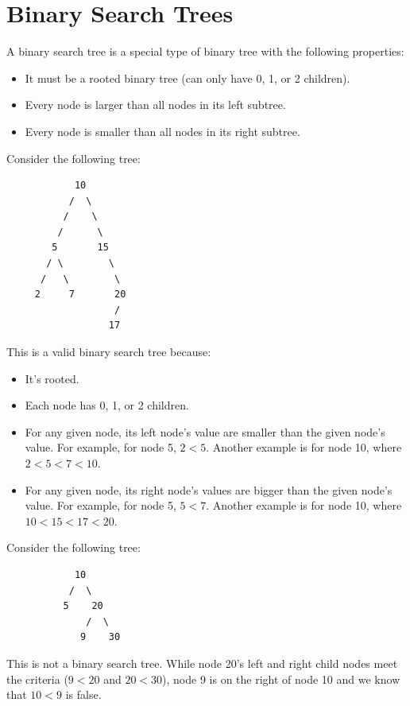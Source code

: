 \documentclass[letterpaper]{article}
\begin{document}
\section{Binary Search Trees}
A binary search tree is a special type of binary tree with the following properties: 
\begin{itemize}
    \item It must be a rooted binary tree (can only have 0, 1, or 2 children). 
    \item Every node is larger than all nodes in its left subtree. 
    \item Every node is smaller than all nodes in its right subtree. 
\end{itemize}

Consider the following tree: 
\begin{verbatim}
            10
           /  \  
          /    \ 
         /      \ 
        5       15 
       / \        \ 
      /   \        \ 
     2     7       20 
                   /
                  17 
\end{verbatim}
This is a valid binary search tree because: 
\begin{itemize}
    \item It's rooted. 
    \item Each node has 0, 1, or 2 children. 
    \item For any given node, its left node's value are smaller than the given node's value. For example, for node 5, $2 < 5$. Another example is for node 10, where $2 < 5 < 7 < 10$. 
    \item For any given node, its right node's values are bigger than the given node's value. For example, for node 5, $5 < 7$. Another example is for node 10, where $10 < 15 < 17 < 20$.
\end{itemize}

Consider the following tree: 
\begin{verbatim}
            10 
           /  \  
          5    20
              /  \  
             9    30
\end{verbatim}
This is not a binary search tree. While node 20's left and right child nodes meet the criteria ($9 < 20$ and $20 < 30$), node 9 is on the right of node 10 and we know that $10 < 9$ is false. 
\end{document}
